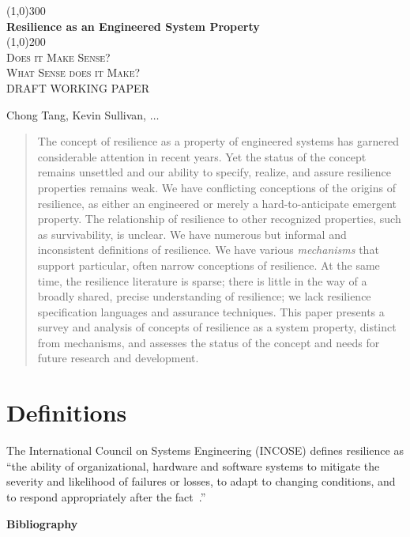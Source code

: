 \documentclass[11pt]{article}
\begin{document}
\begin{titlepage}
  \begin{center}
    \line(1,0){300} \\
    [0.25in]
    \huge{\bfseries Resilience as an Engineered System Property} \\
    [2mm]
    \line(1,0){200} \\
    [1.5cm]
    \textsc{\LARGE Does it Make Sense? \\ What Sense does it Make?} \\
    [3cm]
    DRAFT WORKING PAPER \\
    [6.0cm]
  \end{center}
  \begin{flushright}
    Chong Tang, Kevin Sullivan, $\ldots$\\
  \end{flushright}
\end{titlepage}


\begin{abstract}
  The concept of resilience as a property of engineered systems has
  garnered considerable attention in recent years. Yet the status of
  the concept remains unsettled and our ability to specify, realize,
  and assure resilience properties remains weak.  We have conflicting
  conceptions of the origins of resilience, as either an engineered or
  merely a hard-to-anticipate emergent property. The relationship of
  resilience to other recognized properties, such as survivability, is
  unclear. We have numerous but informal and inconsistent definitions
  of resilience. We have various {\it mechanisms\/} that support
  particular, often narrow conceptions of resilience. At the same
  time, the resilience literature is sparse; there is little in the
  way of a broadly shared, precise understanding of resilience; we
  lack resilience specification languages and assurance techniques.
  This paper presents a survey and analysis of concepts of resilience
  as a system property, distinct from mechanisms, and assesses the
  status of the concept and needs for future research and development.
\end{abstract}


\section{Definitions}

The International Council on Systems Engineering (INCOSE) defines resilience as ``the ability of organizational, hardware and software systems to mitigate the severity and likelihood of failures or losses, to adapt to changing conditions, and to respond appropriately after the fact~\cite{incose}.''


\begin{center}
  {\Large \bf Bibliography}
\end{center}

\nocite{*}
 
\end{document}
